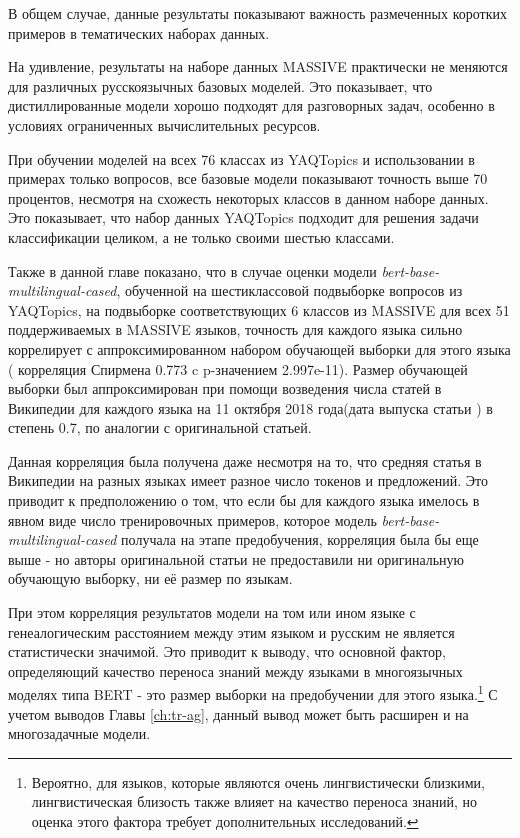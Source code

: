 {В общем случае, данные результаты показывают важность размеченных коротких примеров в тематических наборах данных. 

На удивление, результаты на наборе данных {MASSIVE} практически не меняются для различных русскоязычных базовых моделей. Это показывает, что дистиллированные модели хорошо подходят для разговорных задач, особенно в условиях ограниченных вычислительных ресурсов.

При обучении моделей на всех 76 классах из {YAQTopics} и использовании в примерах только вопросов, все базовые модели показывают точность выше 70 процентов, несмотря на схожесть некоторых классов в данном наборе данных. Это показывает, что набор данных {YAQTopics} подходит для решения задачи классификации целиком, а не только своими шестью классами.

Также в данной главе показано, что в случае оценки модели  \textit{bert-base-multilingual-cased}, обученной на шестиклассовой подвыборке вопросов из {YAQTopics}, на подвыборке соответствующих 6 классов из {MASSIVE} для всех 51 поддерживаемых в {MASSIVE} языков, точность для каждого языка сильно коррелирует с аппроксимированном набором обучающей выборки для этого языка ( корреляция Спирмена 0.773 c p-значением 2.997e-11). Размер обучающей выборки был аппроксимирован при помощи возведения числа статей в Википедии для каждого языка на 11 октября 2018 года(дата выпуска статьи \cite{bert}) в степень 0.7, по аналогии с оригинальной статьей.

Данная корреляция была получена даже несмотря на то, что средняя статья в Википедии на разных языках имеет разное число токенов и предложений. Это приводит к предположению о том, что если бы для каждого языка имелось в явном виде число тренировочных примеров, которое модель \textit{bert-base-multilingual-cased} получала на этапе предобучения, корреляция была бы еще выше - но авторы оригинальной статьи не предоставили ни оригинальную обучающую выборку, ни её размер по языкам. 

При этом корреляция результатов модели на том или ином языке с генеалогическим расстоянием между этим языком и русским не является статистически значимой. Это приводит к выводу, что основной фактор, определяющий качество переноса знаний между языками в многоязычных моделях типа BERT - это размер выборки на предобучении для этого языка.\footnote{Вероятно, для языков, которые являются очень лингвистически близкими, лингвистическая близость также влияет на качество переноса знаний, но оценка этого фактора требует дополнительных исследований.} С учетом выводов Главы \ref{ch:tr-ag}, данный вывод может быть расширен и на многозадачные модели.

}
